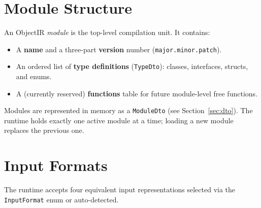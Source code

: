 \documentclass[11pt,a4paper]{article}
\newcommand{\typename}[1]{\textcolor{typecolor}{\texttt{\small #1}}}
\begin{document}
\section{Module Structure}

An ObjectIR \emph{module} is the top-level compilation unit. It contains:

\begin{itemize}[leftmargin=1.8em]
  \item A \textbf{name} and a three-part \textbf{version} number
    (\texttt{major.minor.patch}).
  \item An ordered list of \textbf{type definitions}
    (\typename{TypeDto}): classes, interfaces, structs, and enums.
  \item A (currently reserved) \textbf{functions} table for future
    module-level free functions.
\end{itemize}

Modules are represented in memory as a \typename{ModuleDto} (see
Section~\ref{sec:dto}). The runtime holds exactly one active module at a
time; loading a new module replaces the previous one.

\section{Input Formats}
\label{sec:formats}

The runtime accepts four equivalent input representations selected via the
\typename{InputFormat} enum or auto-detected.
\end{document}
